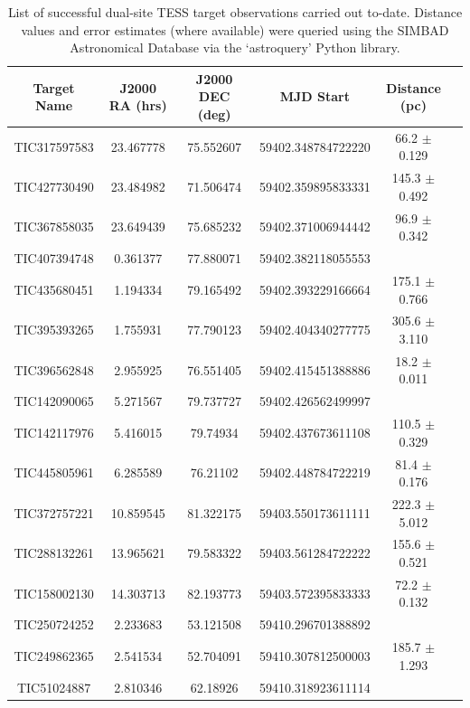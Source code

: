 \documentclass{aastex63}
\begin{document}
\appendix
\restartappendixnumbering
\begin{table}[h!]
    \caption{List of successful dual-site TESS target observations carried out to-date. Distance values and error estimates (where available) were queried using the SIMBAD Astronomical Database via the `astroquery' Python library.}
    \begin{tabular*}{\textwidth}{c @{\extracolsep{\fill}} ccccc}
        \toprule
        \textbf{Target Name} & \textbf{J2000 RA (hrs)} & \textbf{J2000 DEC (deg)} & \textbf{MJD Start} & \textbf{Distance (pc)} \\
        \hline \hline
        TIC317597583 & 23.467778 & 75.552607 & 59402.348784722220 & 66.2 \(\pm\) 0.129 \\
        TIC427730490 & 23.484982 & 71.506474 & 59402.359895833331 & 145.3 \(\pm\) 0.492 \\
        TIC367858035 & 23.649439 & 75.685232 & 59402.371006944442 & 96.9 \(\pm\) 0.342 \\
        TIC407394748 & 0.361377 & 77.880071 & 59402.382118055553 & \\
        TIC435680451 & 1.194334 & 79.165492 & 59402.393229166664 & 175.1 \(\pm\) 0.766\\
        TIC395393265 & 1.755931 & 77.790123 & 59402.404340277775 & 305.6 \(\pm\) 3.110\\
        TIC396562848 & 2.955925 & 76.551405 & 59402.415451388886 & 18.2 \(\pm\) 0.011 \\
        TIC142090065 & 5.271567 & 79.737727 & 59402.426562499997 & \\
        TIC142117976 & 5.416015 & 79.74934 & 59402.437673611108 & 110.5 \(\pm\) 0.329 \\
        TIC445805961 & 6.285589 & 76.21102 & 59402.448784722219 & 81.4 \(\pm\) 0.176 \\
        TIC372757221 & 10.859545 & 81.322175 & 59403.550173611111 & 222.3 \(\pm\) 5.012 \\
        TIC288132261 & 13.965621 & 79.583322 & 59403.561284722222 & 155.6 \(\pm\) 0.521 \\
        TIC158002130 & 14.303713 & 82.193773 & 59403.572395833333 & 72.2 \(\pm\) 0.132 \\
        TIC250724252 & 2.233683 & 53.121508 & 59410.296701388892 & \\
        TIC249862365 & 2.541534 & 52.704091 & 59410.307812500003 & 185.7 \(\pm\) 1.293 \\
        TIC51024887 & 2.810346 & 62.18926 & 59410.318923611114 & \\

\end{tabular*}
\end{table}
\end{document}
